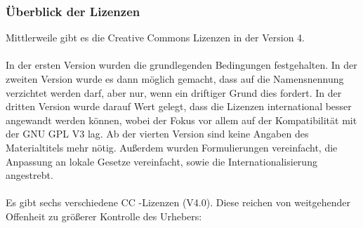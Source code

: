 \documentclass[titlepage,12pt,twoside]{article}
\begin{document}
\subsubsection{Überblick der Lizenzen}
Mittlerweile gibt es die Creative Commons Lizenzen in der Version 4. \\
\\
In der ersten Version wurden die grundlegenden Bedingungen festgehalten.  In der zweiten Version wurde es dann möglich gemacht, dass auf die 
Namensnennung verzichtet werden darf, aber nur, wenn ein driftiger Grund dies fordert.  In der dritten Version wurde darauf Wert gelegt, dass 
die Lizenzen international besser angewandt werden können, wobei der Fokus vor allem auf der Kompatibilität mit der GNU GPL V3 lag.  Ab der 
vierten Version sind keine Angaben des Materialtitels mehr nötig. Außerdem wurden Formulierungen vereinfacht, die Anpassung an lokale Gesetze 
vereinfacht, sowie die Internationalisierung angestrebt. \\
\\
Es gibt sechs verschiedene CC -Lizenzen (V4.0). Diese reichen von weitgehender Offenheit zu größerer Kontrolle des Urhebers: \\
\end{document}
